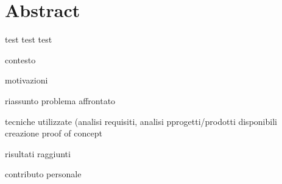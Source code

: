 \chapter*{Abstract} %
\label{abtract}


test test test

contesto 

motivazioni

riassunto problema affrontato

tecniche utilizzate
(analisi requisiti, analisi pprogetti/prodotti disponibili
creazione proof of concept


risultati raggiunti

contributo personale


\newpage

